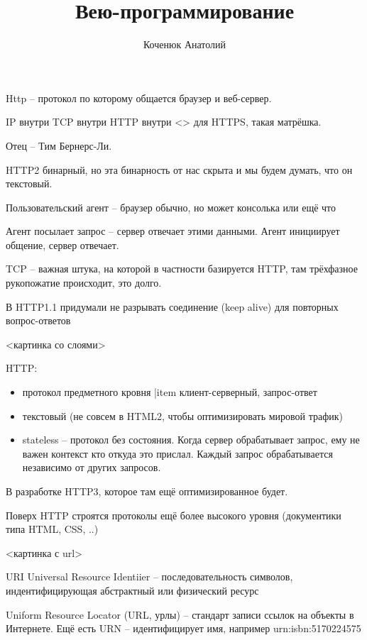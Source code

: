 \documentclass{book}
\author{Коченюк Анатолий}
\title{Вею-программирование}
\theoremstyle{definition}
\begin{document}
    \maketitle
    Http -- протокол по которому общается браузер и веб-сервер. 

    IP внутри TCP внутри HTTP внутри <> для HTTPS, такая матрёшка.

    Отец -- Тим Бернерс-Ли.

    HTTP2 бинарный, но эта бинарность от нас скрыта и мы будем думать, что он текстовый.

    Пользовательский агент -- браузер обычно, но может консолька или ещё что

    Агент посылает запрос -- сервер отвечает этими данными. Агент инициирует общение, сервер отвечает.

    TCP -- важная штука, на которой в частности базируется HTTP, там трёхфазное рукопожатие происходит, это долго.

    В HTTP1.1 придумали не разрывать соединение (keep alive) для повторных вопрос-ответов

    <картинка со слоями>

    HTTP:
    \begin{itemize}
        \item протокол предметного кровня
            |item клиент-серверный, запрос-ответ
        \item текстовый (не совсем в HTML2, чтобы оптимизировать мировой трафик)
        \item stateless -- протокол без состояния. Когда сервер обрабатывает запрос, ему не важен контекст кто откуда это прислал. Каждый запрос обрабатывается независимо от других запросов.
    \end{itemize}

    В разработке HTTP3, которое там ещё оптимизированное будет.

    Поверх HTTP строятся протоколы ещё более высокого уровня (документики типа HTML, CSS, ..)

    <картинка с url>

    \begin{definition}
        URI Universal Resource Identiier -- последовательность символов, индентифицирующая абстрактный или физический ресурс
    \end{definition}

    \begin{definition}
        Uniform Resource Locator (URL, урлы) -- стандарт записи ссылок на объекты в Интернете. Ещё есть URN  -- идентифицирует имя, например urn:isbn:5170224575
    \end{definition}
\end{document}
